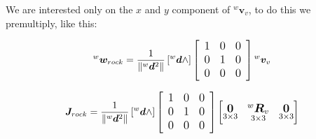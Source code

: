 \documentclass{article}
\begin{document}
\noindent
We are interested only on the $x$ and $y$ component of ${^w}{\boldsymbol v_{v}}$, to do this we premultiply, like this:

\begin{equation}
\large
{^w}\boldsymbol w_{rock}=\frac{1}{\left\|{^w} \boldsymbol d^{2}\right\|}\left[{^w}{\boldsymbol d} \wedge\right]\left[\begin{array}{lll}
1 & 0 & 0 \\
0 & 1 & 0 \\
0 & 0 & 0
\end{array}\right] {^w}{\boldsymbol v_{v}}
\end{equation}




\begin{equation}
\large
{\boldsymbol J_{rock}} =
\frac{1}{\left\|{^w} \boldsymbol d^{2}\right\|}\left[{^w}{\boldsymbol d} \wedge\right]\left[\begin{array}{lll}
1 & 0 & 0 \\
0 & 1 & 0 \\
0 & 0 & 0
\end{array}\right]
    \begin{bmatrix}
     \underset{3\times 3}{\boldsymbol{0}} & \underset{ 3\times 3}{^{w}\boldsymbol{R}_{v}} & \underset{3\times 3}{\boldsymbol{0}} \\
    \end{bmatrix}
\end{equation}
\end{document}
